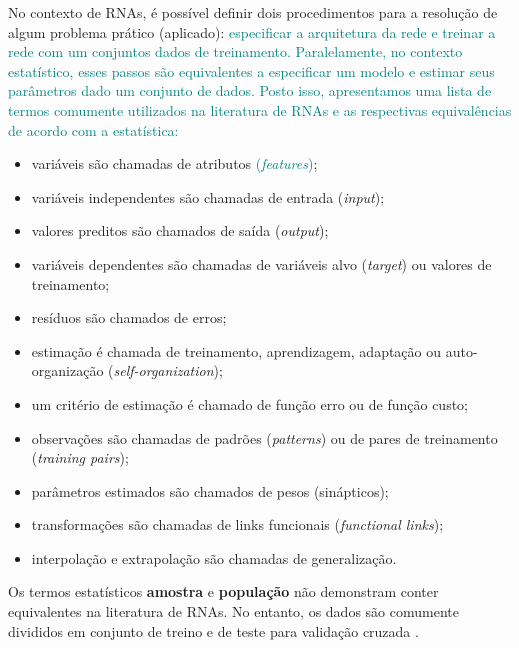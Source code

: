 \documentclass{automatextcc}
\newcommand{\nico}[1]{\textcolor{teal}{#1}}
\newcommand{\pumi}[1]{\textcolor{red}{#1}}
\begin{document}
No contexto de RNAs, é possível definir dois procedimentos para a resolução de algum problema prático (aplicado): \nico{especificar a arquitetura da rede e treinar a rede com um conjuntos dados de treinamento. Paralelamente, no contexto estatístico, esses passos são equivalentes a especificar um modelo e estimar seus parâmetros dado um conjunto de dados. Posto isso, apresentamos uma lista de termos comumente utilizados na literatura de RNAs e as respectivas equivalências de acordo com a estatística:}
\begin{itemize}
    \item variáveis são chamadas de atributos \nico{(\textit{features})};
    \item variáveis independentes são chamadas de entrada (\textit{input});
    \item valores preditos são chamados de saída (\textit{output});
    \item variáveis dependentes são chamadas de variáveis alvo (\textit{target}) ou valores de treinamento;
    \item resíduos são chamados de erros;
    \item estimação é chamada de treinamento, aprendizagem, adaptação ou auto-organização (\textit{self-organization});
    \item um critério de estimação é chamado de função erro ou de função custo;
    \item observações são chamadas de padrões (\textit{patterns}) ou de pares de treinamento (\textit{training pairs});
    \item parâmetros estimados são chamados de pesos (sinápticos);
    \item transformações são chamadas de links funcionais (\textit{functional links});
    \item interpolação e extrapolação são chamadas de generalização.
\end{itemize}
Os termos estatísticos \textbf{amostra} e \textbf{população} não demonstram conter equivalentes na literatura de RNAs. No entanto, os dados são comumente divididos em conjunto de treino e de teste para validação cruzada \citep{cheng1994}.
\end{document}
